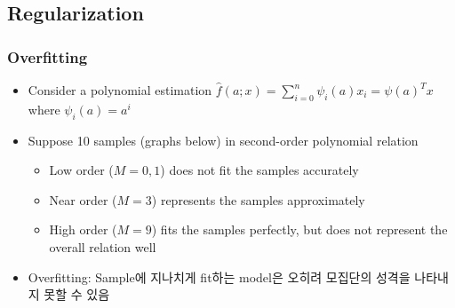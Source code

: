 \subsection{Regularization}

\subsubsection*{Overfitting}
\begin{itemize}
    \item Consider a polynomial estimation $\hat{f}(a;x)=\sum_{i=0}^n\psi_i(a)x_i=\psi(a)^Tx$ where $\psi_i(a)=a^i$
    \item Suppose 10 samples (graphs below) in second-order polynomial relation
    \begin{itemize}
        \item Low order ($M=0,1$) does not fit the samples accurately
        \item Near order ($M=3$) represents the samples approximately
        \item High order ($M=9$) fits the samples perfectly, but does not represent the overall relation well
    \end{itemize}
    \item Overfitting: Sample에 지나치게 fit하는 model은 오히려 모집단의 성격을 나타내지 못할 수 있음
\end{itemize}
\begin{figures}
\end{figures}

